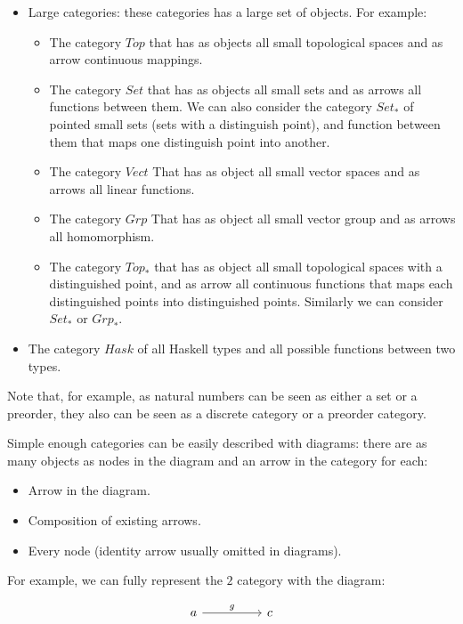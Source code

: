 \begin{example}
\begin{itemize}
\item Large categories: these categories has a large set of objects. For example:
  \begin{itemize}
  \item The category $Top$ that has as objects all small topological spaces and as arrow continuous mappings.
\item The category $Set$ that has as objects all small sets and as arrows all functions between them. We can also consider the category $Set_*$ of pointed small sets (sets with a distinguish point), and function between them that maps one distinguish point into another.  
\item The category $Vect$ That has as object all small vector spaces and as arrows all linear functions.
\item The category $Grp$ That has as object all small vector group and as arrows all homomorphism.
      \item The category $Top_*$ that has as object all small topological spaces with a distinguished point, and as arrow all continuous functions that maps each distinguished points into distinguished points. Similarly we can consider $Set_*$ or $Grp_*$.
\end{itemize}

\item The category $Hask$ of all Haskell types and all possible functions between two types.\\
  
\end{itemize}
Note that, for example, as natural numbers can be seen as either a set or a preorder, they also can be seen as a discrete category or a preorder category.
\end{example}


Simple enough categories can be easily described with diagrams: there are as many objects as nodes in the diagram and an arrow in the category for each:
\begin{itemize}
\item Arrow in the diagram. 
\item Composition of existing arrows.
\item Every node (identity arrow usually omitted in diagrams).
\end{itemize}

For example, we can fully represent the $2$ category with the diagram:

    \[
      \begin{tikzcd}
        a\arrow[rr, "g"] && c\\
      \end{tikzcd}
    \]




